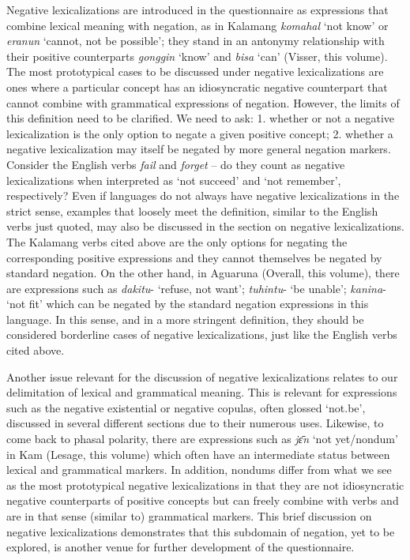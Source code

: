 \documentclass[output=paper,colorlinks,citecolor=brown]{langscibook}
\begin{document}
Negative lexicalizations are introduced in the questionnaire as expressions that combine lexical meaning with negation, as in Kalamang \textit{komahal} `not know' or \textit{eranun} `cannot, not be possible'; they stand in an antonymy relationship with their positive counterparts \textit{gonggin} `know' and \textit{bisa} `can' (Visser, this volume). The most prototypical cases to be discussed under negative lexicalizations are ones where a particular concept has an idiosyncratic negative counterpart that cannot combine with grammatical expressions of negation. However, the limits of this definition need to be clarified. We need to ask: 1. whether or not a negative lexicalization is the only option to negate a given positive concept; 2. whether a negative lexicalization may itself be negated by more general negation markers. Consider the English verbs \textit{fail} and \textit{forget} – do they count as negative lexicalizations  when interpreted as `not succeed' and `not remember', respectively? Even if languages do not always have negative lexicalizations in the strict sense, examples that loosely meet the definition, similar to the English verbs just quoted, may also be discussed in the section on negative lexicalizations. The Kalamang verbs cited above are the only options for negating the corresponding positive expressions and they cannot themselves be negated by standard negation. On the other hand, in Aguaruna (Overall, this volume), there are expressions such as \textit{dakitu}- `refuse, not want’; \textit{tuhintu}- `be unable’; \textit{kanina}- `not fit’ which can be negated by the standard negation expressions in this language. In this sense, and in a more stringent definition, they should be considered borderline cases of negative lexicalizations, just like the English verbs cited above. 

Another issue relevant for the discussion of negative lexicalizations relates to our delimitation of lexical and grammatical meaning. This is relevant for expressions such as the negative existential or negative copulas, often glossed `not.be', discussed in several different sections due to their numerous uses. Likewise, to come back to phasal polarity, there are expressions such as \textit{jɛ̄n} `not yet\slash nondum' in Kam (Lesage, this volume) which often have an intermediate status between lexical and grammatical markers. In addition, nondums differ from what we see as the most prototypical negative lexicalizations in that they are not idiosyncratic negative counterparts of positive concepts but can freely combine with verbs and are in that sense (similar to) grammatical markers. This brief discussion on negative lexicalizations demonstrates that this subdomain of negation, yet to be explored, is another venue for further development of the questionnaire.
\end{document}
